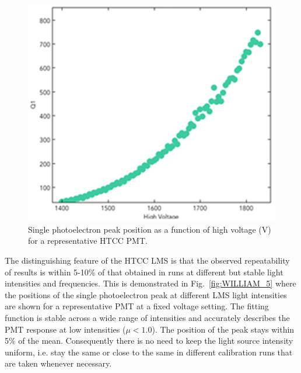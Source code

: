 \begin{figure}[ht]
\centering
\includegraphics[width=0.99\linewidth]{images/WILLIAM_3_NEW.png}
\caption{Single photoelectron peak position as a function of high voltage (V) for a representative HTCC PMT.}
\label{fig:WILLIAM_3_NEW}
\end{figure}

The distinguishing feature of the HTCC LMS is that the observed repeatability of results is within 5-10\% of that
obtained in runs at different but stable light intensities and frequencies. This is demonstrated in
Fig.~\ref{fig:WILLIAM_5} where the positions of the single photoelectron peak at different LMS light
intensities are shown for a representative PMT at a fixed voltage setting. The fitting function is stable across a
wide range of intensities and accurately describes the PMT response at low intensities ($\mu<1.0$). The position of
the peak stays within 5\% of the mean. Consequently there is no need to keep the light source intensity uniform, i.e.
stay the same or close to the same in different calibration runs that are taken whenever necessary.

